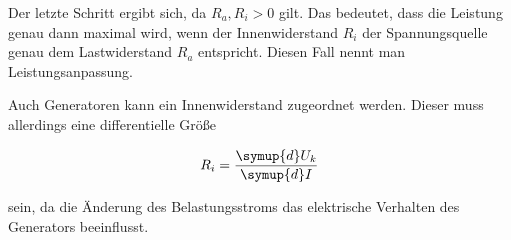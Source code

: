 Der letzte Schritt ergibt sich, da $R_a, R_i > 0$ gilt. Das bedeutet, dass
die Leistung genau dann maximal wird, wenn der Innenwiderstand $R_i$ der 
Spannungsquelle genau dem Lastwiderstand $R_a$ entspricht. Diesen Fall
nennt man Leistungsanpassung. 

Auch Generatoren kann ein Innenwiderstand zugeordnet werden. Dieser muss
allerdings eine differentielle Größe 

\begin{equation}
R_i = \frac{\symup{d}U_k}{\symup{d} I}
\end{equation}

sein, da die Änderung des Belastungsstroms das elektrische Verhalten des 
Generators beeinflusst. 
